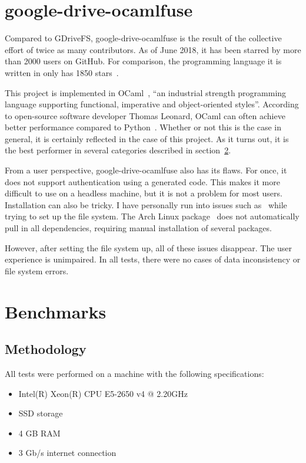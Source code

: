 \section{google-drive-ocamlfuse}

Compared to GDriveFS, google-drive-ocamlfuse is the result of the collective effort of twice as many contributors. As of June 2018, it has been starred by more than 2000 users on GitHub. For comparison, the programming language it is written in only has 1850 stars~\cite{ocaml}.

This project is implemented in OCaml~\cite{ocaml-website}, ``an industrial strength programming language supporting functional, imperative and object-oriented styles''. According to open-source software developer Thomas Leonard, OCaml can often achieve better performance compared to Python~\cite{python_to_ocaml_retrospective}. Whether or not this is the case in general, it is certainly reflected in the case of this project. As it turns out, it is the best performer in several categories described in section~\ref{benchmarks}.

From a user perspective, google-drive-ocamlfuse also has its flaws. For once, it does not support authentication using a generated code. This makes it more difficult to use on a headless machine, but it is not a problem for most users. Installation can also be tricky. I have personally run into issues such as~\cite{opam-depext-issue} while trying to set up the file system. The Arch Linux package~\cite{google-drive-ocamlfuse-aur} does not automatically pull in all dependencies, requiring manual installation of several packages.

However, after setting the file system up, all of these issues disappear. The user experience is unimpaired. In all tests, there were no cases of data inconsistency or file system errors.

\section{Benchmarks} \label{benchmarks}

\subsection{Methodology}

All tests were performed on a machine with the following specifications:

\begin{itemize}
  \setlength\itemsep{-0.4em}
  \item Intel(R) Xeon(R) CPU E5-2650 v4 @ 2.20GHz
  \item SSD storage
  \item 4 GB RAM
  \item 3 Gb/s internet connection
\end{itemize}

